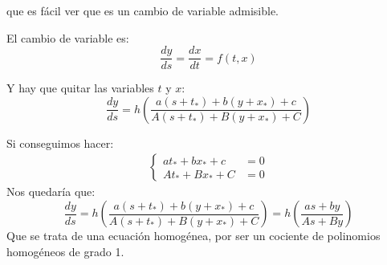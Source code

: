 que es fácil ver que es un cambio de variable admisible.

El cambio de variable es:
\begin{equation*}
    \dfrac{dy}{ds} = \dfrac{dx}{dt} = f(t,x)
\end{equation*}

Y hay que quitar las variables $t$ y $x$:
\begin{equation*}
    \dfrac{dy}{ds} = h\left(\dfrac{a(s+t_*)+b(y+x_*)+c}{A(s+t_*)+B(y+x_*)+C}\right)
\end{equation*}

Si conseguimos hacer:
\begin{gather*}
    \left\{\begin{array}{ll}
            at_* + bx_* + c &= 0 \\
        At_* + Bx_* + C &= 0
    \end{array}\right.
\end{gather*}
Nos quedaría que:
\begin{equation*}
    \dfrac{dy}{ds} = h\left(\dfrac{a(s+t_*)+b(y+x_*)+c}{A(s+t_*)+B(y+x_*)+C}\right) = h\left(\dfrac{as + by}{As+By}\right)
\end{equation*}
Que se trata de una ecuación homogénea, por ser un cociente de polinomios homogéneos de grado 1.\\

